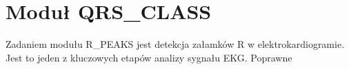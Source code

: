 

\section{Moduł QRS\_CLASS}
Zadaniem modułu R\_PEAKS jest detekcja załamków R w elektrokardiogramie. Jest to jeden z kluczowych etapów analizy sygnału EKG. Poprawne 
